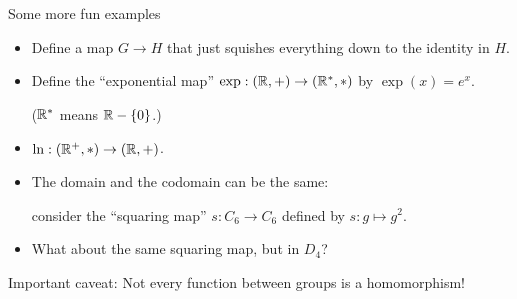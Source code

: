 \documentclass[8pt, handout]{beamer}
\begin{document}
\begin{frame}{Some more fun examples}
  \begin{itemize}
    \item Define a map $G\to H$ that just squishes everything down to the identity in $H$. \pause
    \item Define the ``exponential map'' $\exp: (\mathbb{R}, +) \to (\mathbb{R}^*, \ast)$ by $\exp(x) = e^x$. 
    
    ($\mathbb{R}^*$ means $\mathbb{R} - \{0\}$.)
    \pause
    \item $\ln: (\mathbb{R}^+, \ast) \to (\mathbb{R}, +)$. \pause
    \item The domain and the codomain can be the same:

    consider the ``squaring map'' $s: C_6 \to C_6$ defined by $s: g \mapsto g^2$. \pause

    \item What about the same squaring map, but in $D_4$? \pause
  \end{itemize}
  \begin{alertblock}{Important caveat:}
    Not every function between groups is a homomorphism!
  \end{alertblock}
\end{frame}

\end{document}
